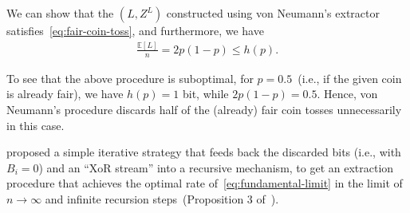 \documentclass[12pt]{article}
\begin{document}
\begin{proposition}
\label{prop:von-neumann-extractor} We can show that the $(L, Z^L)$ constructed using von Neumann's extractor satisfies~\eqref{eq:fair-coin-toss}, and furthermore, we have 
\begin{align}
\frac{\mathbb{E}[L]}{n} = 2 p (1-p) \leq h(p). 
\end{align}
\end{proposition}

\begin{remark}
\label{remark:peres} 
To see that the above procedure is suboptimal, for $p=0.5$~(i.e., if the given coin is already fair), we have $h(p)=1$ bit, while $2p(1-p) = 0.5$. Hence, von Neumann's procedure discards half of the (already) fair coin tosses unnecessarily in this case. 

\citet{peres1992iterating} proposed a simple iterative strategy that feeds back the discarded bits (i.e., with $B_i=0$) and an ``XoR stream'' into a recursive mechanism, to get an extraction procedure that achieves the optimal rate of~\eqref{eq:fundamental-limit} in the limit of $n \to \infty$ and infinite recursion steps~(Proposition 3 of~\citet{peres1992iterating}).  
\end{remark}





\end{document}

